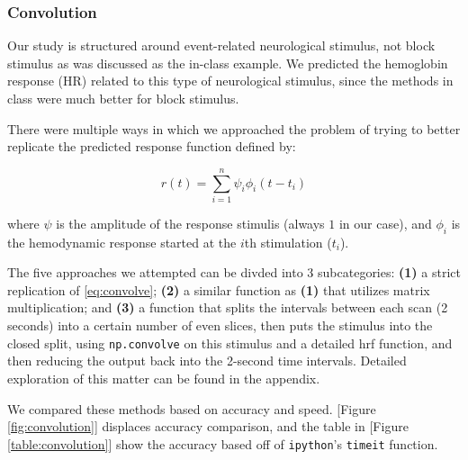 \subsubsection{Convolution}
\par \indent Our study is structured around event-related neurological 
stimulus, not block stimulus as was discussed as the in-class example. We 
predicted the hemoglobin response (HR) related to this type of neurological 
stimulus, since the methods in class were much better for block stimulus. 

There were multiple ways in which we approached the problem of trying to 
better replicate the predicted response function defined by:

\begin{equation} \label{eq:convolve}
r(t)= \sum_{i=1}^n \psi_{i} \phi_{i}(t-t_i)
\end{equation}

where $\psi$ is the amplitude of the response stimulis (always $1$ in our 
case), and $\phi_{i}$ is the hemodynamic response started at the $i$th 
stimulation ($t_i$).

The five approaches we attempted can be divded into 3 subcategories: 
\textbf{(1)} a strict replication of \ref{eq:convolve}; \textbf{(2)} a similar 
function as \textbf{(1)} that utilizes matrix multiplication; and \textbf{(3)} a 
function that splits the intervals between each scan (2 seconds) into a certain 
number of even slices, then puts the stimulus into the closed split, using 
\texttt{np.convolve} on this stimulus and a detailed hrf function, and then 
reducing the output back into the 2-second time intervals. Detailed exploration 
of this matter can be found in the appendix.

We compared these methods based on accuracy and speed. [Figure 
\ref{fig:convolution}] displaces accuracy comparison, and the table in [Figure 
\ref{table:convolution}] show the accuracy based off of \texttt{ipython}'s 
\texttt{timeit} function.



